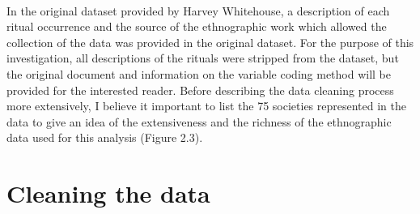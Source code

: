 \documentclass[12pt]{report}
\begin{document}
	\\
	\noindent In the original dataset provided by Harvey Whitehouse, a description of each ritual occurrence and the source of the ethnographic work which allowed the collection of the data was provided in the original dataset. For the purpose of this investigation, all descriptions of the rituals were stripped from the dataset, but the original document and information on the variable coding method will be provided for the interested reader. Before describing the data cleaning process more extensively, I believe it important to list the 75 societies represented in the data to give an idea of the extensiveness and the richness of the ethnographic data used for this analysis (Figure 2.3).

	
	\section{Cleaning the data}
	
\end{document}

